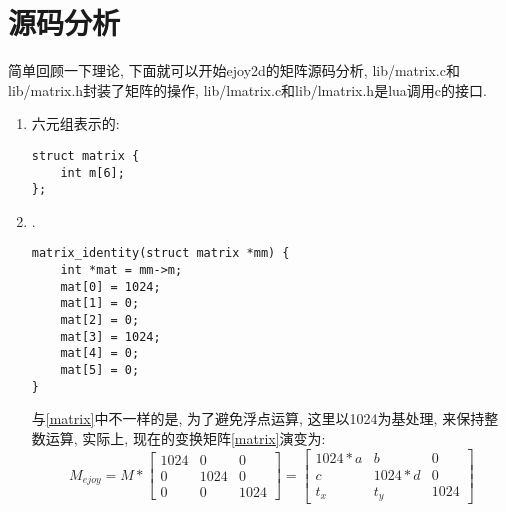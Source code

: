 \section {\Large \ZHH 源码分析} {

    { 简单回顾一下理论, 下面就可以开始ejoy2d的矩阵源码分析, lib/matrix.c和lib/matrix.h封装了矩阵的操作, lib/lmatrix.c和lib/lmatrix.h是lua调用c的接口.}

    \begin {enumerate}

    \gaccobsplitinv

    \item { 六元组表示的{}:
        \begin{lstlisting}[language={[ANSI]C}]
struct matrix {
    int m[6];
};
        \end{lstlisting}
    }

    \gaccobsplitinv

    \item { {}.
        \begin{lstlisting}[language={[ANSI]C}]
matrix_identity(struct matrix *mm) {
    int *mat = mm->m;
    mat[0] = 1024;
    mat[1] = 0;
    mat[2] = 0;
    mat[3] = 1024;
    mat[4] = 0;
    mat[5] = 0;
}
        \end{lstlisting}
        与\eqref{matrix}中不一样的是, 为了避免浮点运算, 这里以1024为基处理, 来保持整数运算, 实际上, 现在的变换矩阵\eqref{matrix}演变为:
        \begin{equation}\label{matrix_ejoy2d}
            M_{ejoy} =
            M *
            \begin{bmatrix}
                1024    &   0       &   0\\
                0       &   1024    &   0\\
                0       &   0       &   1024
            \end{bmatrix}
            =
            \begin{bmatrix}
                1024 * a    &   b           & 0 \\
                c           &   1024 * d    & 0 \\
                t_x         &   t_y         & 1024
            \end{bmatrix}
        \end{equation}
    }

    \gaccobsplitinv


\end{enumerate}}

